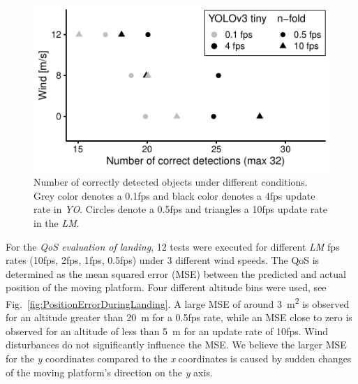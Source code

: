 \documentclass[conference]{IEEEtran}
\begin{document}
\begin{figure}[t]
  \centering
  \includegraphics[scale=0.9]{data_visualization/QoSDetection.pdf}
  \caption{Number of correctly detected objects
  under different conditions. 
  Grey color denotes a 0.1fps and black color denotes a 4fps 
  update rate in \emph{YO}. 
  Circles denote a 0.5fps and triangles a 10fps update 
  rate in the \emph{LM}.}
  \label{fig:NCorrectObjectDetections}
\end{figure}


For the \emph{QoS evaluation of landing}, 12 tests were executed for different 
\emph{LM} fps rates 
(10fps, 2fps, 1fps, 0.5fps) under 3 different wind speeds.
The QoS is determined as the  mean squared error (MSE) 
between the predicted and actual position of the moving platform.
Four different altitude bins were used, see
Fig.~\ref{fig:PositionErrorDuringLanding}. 
A large MSE of around \SI{3}{\square\meter} is observed for an altitude 
greater than \SI{20}{\meter} for a 0.5fps rate, while an MSE close to 
zero is observed for an altitude of less than \SI{5}{\meter} for an 
update rate of 10fps.  Wind disturbances do not significantly
influence the MSE. We believe the larger MSE for the \emph{y} 
coordinates compared to the \emph{x} coordinates is caused by  
sudden changes of the moving platform's direction on the \emph{y} axis.

  
\end{document}
